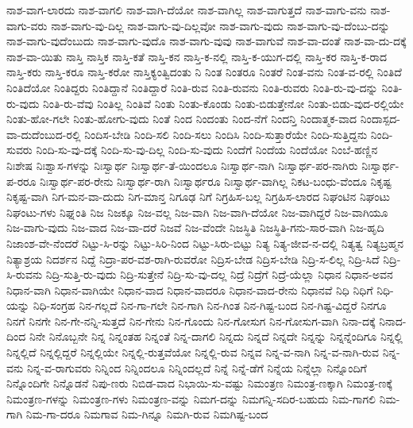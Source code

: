 {ನಾಶ-ವಾಗ-ಲಾರದು
ನಾಶ-ವಾಗಲಿ
ನಾಶ-ವಾಗಿ-ದೆಯೋ
ನಾಶ-ವಾಗಿಲ್ಲ
ನಾಶ-ವಾಗುತ್ತದೆ
ನಾಶ-ವಾಗು-ವನು
ನಾಶ-ವಾಗು-ವರು
ನಾಶ-ವಾಗು-ವು-ದಿಲ್ಲ
ನಾಶ-ವಾಗು-ವು-ದಿಲ್ಲವೋ
ನಾಶ-ವಾಗು-ವುದು
ನಾಶ-ವಾಗು-ವು-ದೆಂಬು-ದನ್ನು
ನಾಶ-ವಾಗು-ವುದೆಂಬುದು
ನಾಶ-ವಾಗು-ವುದೊ
ನಾಶ-ವಾಗು-ವುವು
ನಾಶ-ವಾಗುವೆ
ನಾಶ-ವಾ-ದಂತೆ
ನಾಶ-ವಾ-ದು-ದಕ್ಕೆ
ನಾಶ-ವಾ-ಯಿತು
ನಾಸ್ತಿ
ನಾಸ್ತಿಕ
ನಾಸ್ತಿ-ಕತೆ
ನಾಸ್ತಿ-ಕನ
ನಾಸ್ತಿ-ಕ-ನಲ್ಲಿ
ನಾಸ್ತಿ-ಕ-ಯುಗ-ದಲ್ಲಿ
ನಾಸ್ತಿ-ಕರ
ನಾಸ್ತಿ-ಕ-ರಾದ
ನಾಸ್ತಿ-ಕರು
ನಾಸ್ತಿ-ಕರೂ
ನಾಸ್ತಿ-ಕರೋ
ನಾಸ್ತಿಕ್ಯಂತ್ವಿದಂತು
ನಿ
ನಿಂತ
ನಿಂತರೂ
ನಿಂತರೆ
ನಿಂತ-ವನು
ನಿಂತ-ವ-ರಲ್ಲಿ
ನಿಂತಿದೆ
ನಿಂತಿದೆಯೋ
ನಿಂತಿದ್ದರು
ನಿಂತಿದ್ದಾನೆ
ನಿಂತಿದ್ದಾರೆ
ನಿಂತಿ-ರುವ
ನಿಂತಿ-ರುವನು
ನಿಂತಿ-ರುವರು
ನಿಂತಿ-ರು-ವು-ದನ್ನು
ನಿಂತಿ-ರು-ವುದು
ನಿಂತಿ-ರು-ವೆವು
ನಿಂತಿಲ್ಲ
ನಿಂತಿವೆ
ನಿಂತು
ನಿಂತು-ಕೊಂಡು
ನಿಂತು-ಬಿಡುತ್ತೇನೋ
ನಿಂತು-ಬಿಡು-ವುದ-ರಲ್ಲಿಯೇ
ನಿಂತು-ಹೋ-ಗಲೇ
ನಿಂತು-ಹೋಗು-ವುದು
ನಿಂತೆ
ನಿಂದ
ನಿಂದಂತು
ನಿಂದ-ನೆಗೆ
ನಿಂದನ್ತಿ
ನಿಂದಾತ್ಮಕ-ವಾದ
ನಿಂದಾಸ್ಪದ-ವಾ-ದುದೆಂಬುದ-ರಲ್ಲಿ
ನಿಂದಿಸ-ಬೇಡಿ
ನಿಂದಿ-ಸಲಿ
ನಿಂದಿ-ಸಲು
ನಿಂದಿಸಿ
ನಿಂದಿ-ಸುತ್ತಾರೆಯೇ
ನಿಂದಿ-ಸುತ್ತಿದ್ದನು
ನಿಂದಿ-ಸುವರು
ನಿಂದಿ-ಸು-ವು-ದಕ್ಕೆ
ನಿಂದಿ-ಸು-ವು-ದಿಲ್ಲ
ನಿಂದಿ-ಸು-ವುದು
ನಿಂದೆಗೆ
ನಿಂದೆಯ
ನಿಂದೆಯೋ
ನಿಂಬೆ-ಹಣ್ಣಿನ
ನಿಃಶೇಷ
ನಿಃಶ್ವಾಸ-ಗಳನ್ನು
ನಿಃಸ್ವಾರ್ಥ
ನಿಃಸ್ವಾರ್ಥ-ತೆ-ಯಿಂದಲೂ
ನಿಃಸ್ವಾರ್ಥ-ನಾಗಿ
ನಿಃಸ್ವಾರ್ಥ-ಪರ-ನಾಗಿರು
ನಿಃಸ್ವಾರ್ಥ-ಪ-ರರೂ
ನಿಃಸ್ವಾರ್ಥ-ಪರ-ರೇನು
ನಿಃಸ್ವಾರ್ಥ-ರಾಗಿ
ನಿಃಸ್ವಾರ್ಥರೂ
ನಿಃಸ್ವಾರ್ಥ-ವಾಗಿಲ್ಲ
ನಿಕಟ-ಬಂಧು-ವೆಂದೂ
ನಿಕೃಷ್ಟ
ನಿಕೃಷ್ಟ-ವಾಗಿ
ನಿಗ-ಮನ-ವಾ-ದುದು
ನಿಗ-ಮಾನ್ತ
ನಿಗೂಢ
ನಿಗೆ
ನಿಗ್ರಹಿಸ-ಬಲ್ಲ
ನಿಗ್ರಹಿಸ-ಲಾರದ
ನಿಘಂಟಿನ
ನಿಘಂಟು
ನಿಘಂಟು-ಗಳು
ನಿಘ್ನಂತಿ
ನಿಜ
ನಿಜಕ್ಕೂ
ನಿಜ-ವಲ್ಲ
ನಿಜ-ವಾಗಿ
ನಿಜ-ವಾಗಿ-ದೆಯೋ
ನಿಜ-ವಾಗಿದ್ದರೆ
ನಿಜ-ವಾಗಿಯೂ
ನಿಜ-ವಾಗು-ವುದು
ನಿಜ-ವಾದ
ನಿಜ-ವಾ-ದರೆ
ನಿಜವೆ
ನಿಜ-ವೆಂದೇ
ನಿಜಸ್ಥಿತಿ
ನಿಜಸ್ಥಿತಿ-ಗನು-ಸಾರ-ವಾಗಿ
ನಿಜ-ಹೃದಿ
ನಿಜಾಂಶ-ವೇ-ನೆಂದರೆ
ನಿಟ್ಟು-ಸಿ-ರನ್ನು
ನಿಟ್ಟು-ಸಿರಿ-ನಿಂದ
ನಿಟ್ಟು-ಸಿರು-ಬಿಟ್ಟು
ನಿತ್ಯ
ನಿತ್ಯ-ಜೀವ-ನ-ದಲ್ಲಿ
ನಿತ್ಯತ್ವ
ನಿತ್ಯಬ್ರಹ್ಮನ
ನಿತ್ಯಾಶ್ರಯ
ನಿದರ್ಶನ
ನಿದ್ದೆ
ನಿದ್ರಾ-ಪರ-ವಶ-ರಾಗಿ-ರುವರೋ
ನಿದ್ರಿಸ-ಬೇಡ
ನಿದ್ರಿಸ-ಬೇಡಿ
ನಿದ್ರಿ-ಸ-ಲಿಲ್ಲ
ನಿದ್ರಿ-ಸಿದೆ
ನಿದ್ರಿ-ಸಿ-ರುವನು
ನಿದ್ರಿ-ಸುತ್ತಿ-ರು-ವುದು
ನಿದ್ರಿ-ಸುತ್ತೇನೆ
ನಿದ್ರಿ-ಸು-ವು-ದಲ್ಲ
ನಿದ್ರೆ
ನಿದ್ರೆಗೆ
ನಿದ್ರೆ-ಯೆಲ್ಲಾ
ನಿಧಾನ
ನಿಧಾನ-ಅವನ
ನಿಧಾನ-ವಾಗಿ
ನಿಧಾನ-ವಾಗಿಯೇ
ನಿಧಾನ-ವಾದ
ನಿಧಾನ-ವಾದರೂ
ನಿಧಾನ-ವಾದ-ರೇನು
ನಿಧಾನವೆ
ನಿಧಿ
ನಿಧಿಗೆ
ನಿಧಿ-ಯನ್ನು
ನಿಧಿ-ಸಂಗ್ರಹ
ನಿನ-ಗಲ್ಲದೆ
ನಿನ-ಗಾ-ಗಲೇ
ನಿನ-ಗಾಗಿ
ನಿನ-ಗಿಂತ
ನಿನ-ಗಿಷ್ಟ-ಬಂದ
ನಿನ-ಗಿಷ್ಟ-ವಿದ್ದರೆ
ನಿನಗೂ
ನಿನಗೆ
ನಿನಗೇ
ನಿನ-ಗೇ-ನನ್ನಿ-ಸುತ್ತದೆ
ನಿನ-ಗೇನು
ನಿನ-ಗೊಂದು
ನಿನ-ಗೋಸುಗ
ನಿನ-ಗೋಸುಗ-ವಾಗಿ
ನಿನಾ-ದಕ್ಕೆ
ನಿನಾದ-ದಿಂದ
ನಿನೇ
ನಿನೊಬ್ಬನೇ
ನಿನ್ನ
ನಿನ್ನಂತಹ
ನಿನ್ನಂತೆ
ನಿನ್ನ-ದಾಗಲಿ
ನಿನ್ನದು
ನಿನ್ನದೆ
ನಿನ್ನದೇ
ನಿನ್ನನ್ನು
ನಿನ್ನನ್ನೆಂದಿಗೂ
ನಿನ್ನಲ್ಲಿ
ನಿನ್ನಲ್ಲಿದೆ
ನಿನ್ನಲ್ಲಿದ್ದರೆ
ನಿನ್ನಲ್ಲಿಯೇ
ನಿನ್ನಲ್ಲಿ-ರುತ್ತವೆಯೋ
ನಿನ್ನಲ್ಲಿ-ರುವ
ನಿನ್ನವ
ನಿನ್ನ-ವ-ನಾಗಿ
ನಿನ್ನ-ವ-ನಾಗಿ-ರುವ
ನಿನ್ನ-ವನು
ನಿನ್ನ-ವ-ರಾಗುವರು
ನಿನ್ನಿಂದ
ನಿನ್ನಿಂದಲೂ
ನಿನ್ನಿಂದಲ್ಲದೆ
ನಿನ್ನೆ
ನಿನ್ನೆ-ಡೆಗೆ
ನಿನ್ನೆಯ
ನಿನ್ನೆಲ್ಲಾ
ನಿನ್ನೊಂದಿಗೆ
ನಿನ್ನೊಂದಿಗೇ
ನಿನ್ನೊಡನೆ
ನಿಪು-ಣರು
ನಿಬಿಡ-ವಾದ
ನಿಭಾಯಿ-ಸು-ವಷ್ಟು
ನಿಮಂತ್ರಣ
ನಿಮಂತ್ರ-ಣಕ್ಕಾಗಿ
ನಿಮಂತ್ರ-ಣಕ್ಕೆ
ನಿಮಂತ್ರಣ-ಗಳನ್ನು
ನಿಮಂತ್ರಣ-ಗಳು
ನಿಮಂತ್ರಣ-ವನ್ನು
ನಿಮಗ-ದನ್ನು
ನಿಮಗನ್ನಿ-ಸದಿರ-ಬಹುದು
ನಿಮ-ಗಾಗಲಿ
ನಿಮ-ಗಾಗಿ
ನಿಮ-ಗಾ-ದರೂ
ನಿಮಗಾವ
ನಿಮ-ಗಿನ್ನೂ
ನಿಮಗಿ-ರುವ
ನಿಮಗಿಷ್ಟ-ಬಂದ
}
